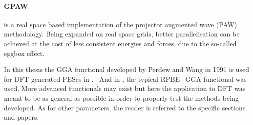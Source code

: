 \paragraph{GPAW}
is a real space based implementation of the projector augmented wave (PAW)~\cite{paw-1994} methodology.
Being expanded on real space grids, better parallelisation can be achieved at the cost of less consistent energies and forces, due to the so-called eggbox effect.\cite{gpaw-2005}

In this thesis the GGA functional developed by Perdew and Wang in 1991 is used for DFT generated PESes in .~\cite{pw91}
And in , the typical RPBE~\cite{dacapo-1999} GGA functional was used.
More advanced functionals may exist but here the application to DFT was meant to be as general as possible in order to properly test the methods being developed.
As for other parameters, the reader is referred to the specific sections and papers.
